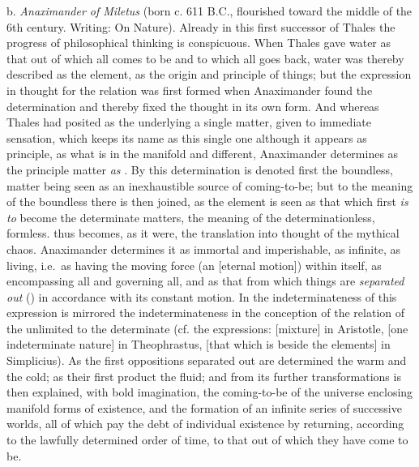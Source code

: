 b. \emph{Anaximander of Miletus} (born c. 611 B.C., flourished toward
the middle of the 6th century. Writing: On Nature). Already in this
first successor of Thales the progress of philosophical thinking is
conspicuous. When Thales gave water as that out of which all comes to
be and to which all goes back, water was thereby described as the
element, as the origin and principle of things; but the expression in
thought for the relation was first formed when Anaximander found the
determination  and thereby fixed the thought in its own form.
And whereas Thales had posited as the underlying a single matter, given
to immediate sensation, which keeps its name as this single one
although it appears as principle, as what is in the manifold and
different, Anaximander determines as the principle matter \emph{as
}. By this determination is denoted first the boundless,
matter being seen as an inexhaustible source of coming-to-be; but to the
meaning of the boundless there is then joined, as the element is seen
as that which first \emph{is to} become the determinate matters, the
meaning of the determinationless,
\setcounter{footnote}{0}formless.  thus
becomes, as it were, the translation into thought of the mythical
chaos. Anaximander determines it as immortal and imperishable, as
infinite, as living, i.e.\ as having the moving force (an  [eternal motion]) within itself, as encompassing all and
governing all, and as that from which things are \emph{separated out}
() in accordance with its constant
motion. In the indeterminateness of this expression is mirrored the
indeterminateness in the conception of the relation of the unlimited
to the determinate (cf. the expressions:  [mixture] in
Aristotle,  [one indeterminate nature] in Theophrastus,  [that which is beside the elements] in Simplicius). As the
first oppositions separated out are determined the warm and the cold;
as their first product the fluid; and from its further transformations
is then explained, with bold imagination, the coming-to-be of the
universe enclosing manifold forms of existence, and the formation of an
infinite series of successive worlds, all of which pay the debt of
individual existence by returning, according to the lawfully determined
order of time, to that out of which they have come to be.

